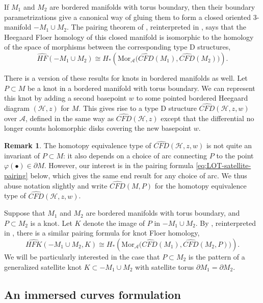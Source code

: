 \documentclass[11pt]{amsart}
\numberwithin{equation}{section}
\numberwithin{theorem}{section}
\theoremstyle{definition}
\newtheorem{remark}[theorem]{Remark}
\newcommand{\Mor}{\mathrm{Mor}}
\newcommand\HFhat{\widehat{\mathit{HF}}}
\newcommand\HFK{\widehat{\mathit{HFK}}}
\newcommand{\CFD}{\widehat{\mathit{CFD}}}
\newcommand{\Alg}{\mathcal{A}}
\begin{document}
If $M_1$ and $M_2$ are bordered manifolds with torus boundary, then their boundary parametrizations give a canonical way of gluing them to form a closed oriented 3-manifold $-M_1\cup M_2$. The pairing theorem of \cite{LOT}, reinterpreted in \cite{LOT-morphism}, says that the Heegaard Floer homology of this closed manifold is isomorphic to the homology of the space of morphisms between the corresponding type D structures, \[\HFhat(-M_1\cup M_2) \cong H_*\left(\Mor_\Alg\big(\CFD(M_1), \CFD(M_2)\big)\right).\]

There is  a version of these results for knots in bordered manifolds as well.  Let $P\subset M$ be a knot in a bordered manifold with torus boundary.  We can represent this knot by adding a second basepoint $w$ to some pointed bordered Heegaard diagram $(\mathcal{H},z)$ for $M$. This gives rise to a type D structure $\CFD(\mathcal{H}, z, w)$ over $\Alg$, defined in the same way as $\CFD(\mathcal{H}, z)$ except that the differential no longer counts holomorphic disks covering the new basepoint $w$. 

\begin{remark}\label{rmk:dependence-on-arc}
The homotopy equivalence type of $\CFD(\mathcal{H}, z, w)$ is not quite an invariant of $P\subset M$: it also depends on a choice of arc connecting $P$ to the point $\varphi(\bullet)\in\partial M$.  However, our interest is in the pairing formula \eqref{eq:LOT-satellite-pairing} below, which gives the same end result for any choice of arc. We thus abuse notation slightly and write $\CFD(M,P)$ for the homotopy equivalence type of $\CFD(\mathcal{H}, z, w)$.
\end{remark}

Suppose that $M_1$ and $M_2$ are bordered manifolds with torus boundary, and $P\subset M_2$ is a knot. Let $K$ denote the image of $P$ in $-M_1\cup M_2$.  By \cite[Theorem 11.19]{LOT}, reinterpreted in \cite{LOT-morphism}, there is a similar pairing formula for knot Floer homology,
\begin{equation}\label{eq:LOT-satellite-pairing}
\HFK(-M_1 \cup M_2, K) \cong H_*\left(\Mor_\Alg\big(\CFD(M_1), \CFD(M_2,P)\big)\right).
\end{equation}
We will be particularly interested in the case that $P\subset M_2$ is the pattern of a generalized satellite knot $K\subset -M_1\cup M_2$ with satellite torus $\partial M_1 = \partial M_2$.



\subsection{An immersed curves formulation}
\end{document}
